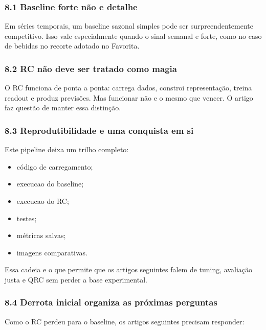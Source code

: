 \documentclass[12pt]{article}
\providecommand{\tightlist}{%
          \setlength{\itemsep}{0pt}\setlength{\parskip}{0pt}}
\begin{document}
\subsubsection{8.1 Baseline forte não e detalhe}\label{81-baseline-forte-nuxe3o-e-detalhe}

Em séries temporais, um baseline sazonal simples pode ser surpreendentemente competitivo. Isso vale especialmente quando o sinal semanal e forte, como no caso de bebidas no recorte adotado no Favorita.

\subsubsection{8.2 RC não deve ser tratado como magia}\label{82-rc-nuxe3o-deve-ser-tratado-como-magia}

O RC funciona de ponta a ponta: carrega dados, constroi representação, treina readout e produz previsões. Mas funcionar não e o mesmo que vencer. O artigo faz questão de manter essa distinção.

\subsubsection{8.3 Reprodutibilidade e uma conquista em si}\label{83-reprodutibilidade-e-uma-conquista-em-si}

Este pipeline deixa um trilho completo:

\begin{itemize}
\tightlist
\item
  código de carregamento;
\item
  execucao do baseline;
\item
  execucao do RC;
\item
  testes;
\item
  métricas salvas;
\item
  imagens comparativas.
\end{itemize}

Essa cadeia e o que permite que os artigos seguintes falem de tuning, avaliação justa e QRC sem perder a base experimental.

\subsubsection{8.4 Derrota inicial organiza as próximas perguntas}\label{84-derrota-inicial-organiza-as-pruxf3ximas-perguntas}

Como o RC perdeu para o baseline, os artigos seguintes precisam responder:
\end{document}
